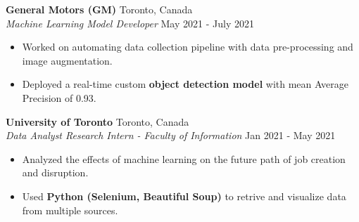\documentclass[a4paper]{article}
\begin{document}
\textbf{General Motors (GM)} \hfill Toronto, Canada\\
\textit{Machine Learning Model Developer} \hfill May 2021 - July 2021\\
\vspace{-3mm}
\begin{itemize} \itemsep 1pt
	\item Worked on automating data collection pipeline with data pre-processing and image augmentation.
	\item Deployed a real-time custom \textbf{object detection model} with mean Average Precision of 0.93.
\end{itemize}

\textbf{University of Toronto} \hfill Toronto, Canada\\
\textit{Data Analyst Research Intern - Faculty of Information} \hfill Jan 2021 - May 2021\\
\vspace{-3mm}
\begin{itemize} \itemsep 1pt
    \item Analyzed the effects of machine learning on the future path of job creation and disruption.
	\item Used \textbf{Python (Selenium, Beautiful Soup)} to retrive and visualize data from multiple sources.
\end{itemize}

\end{document}
